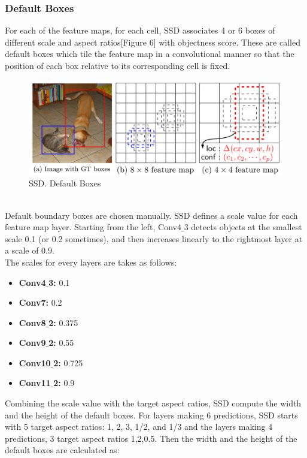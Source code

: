 \documentclass[12pt]{article}
\begin{document}
\subsubsection{Default Boxes}
For each of the feature maps, for each cell, SSD associates 4 or 6 boxes of different scale and aspect ratios[Figure 6] with objectness score. These are called default boxes which tile the feature map in a convolutional manner so that the position of each box relative to its corresponding cell is fixed. 
\begin{figure}[h]
    \centering
    \includegraphics[scale=0.38]{Default Boxes.png}
    \caption{SSD. Default Boxes}
    \label{fig:mesh5}
\end{figure}\\
Default boundary boxes are chosen manually. SSD defines a scale value for each feature map layer. Starting from the left, Conv4$\_$3 detects objects at the smallest scale 0.1 (or 0.2 sometimes), and then increases linearly to the rightmost layer at a scale of 0.9. \\The scales for every layers are takes as follows:\\
\begin{itemize}
    \item \textbf{Conv4$\_$3:} 0.1
    \item \textbf{Conv7:} 0.2
    \item \textbf{Conv8$\_$2:} 0.375
    \item \textbf{Conv9$\_$2:} 0.55
    \item \textbf{Conv10$\_$2:} 0.725
    \item \textbf{Conv11$\_$2:} 0.9
\end{itemize}
Combining the scale value with the target aspect ratios, SSD compute the width and the height of the default boxes. For layers making 6 predictions, SSD starts with 5 target aspect ratios: 1, 2, 3, 1/2, and 1/3 and the layers making 4 predictions, 3 target aspect ratios 1,2,0.5. Then the width and the height of the default boxes are calculated as:\\
\end{document}
